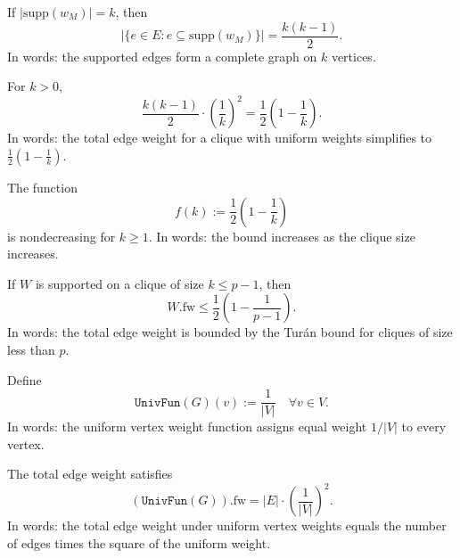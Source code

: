 \begin{lemma}
  \label{lem:clique_size}
  \leanok
If \(|\mathrm{supp}(w_M)| = k\), then
\[
|\{ e \in E : e \subseteq \mathrm{supp}(w_M) \}| = \frac{k(k-1)}{2}.
\]
In words: the supported edges form a complete graph on \(k\) vertices.
\end{lemma}

\begin{lemma}
  \label{lem:computation}
  \leanok
For \(k > 0\),
\[
\frac{k(k-1)}{2} \cdot \left(\frac{1}{k}\right)^2 = \frac{1}{2}\left(1 - \frac{1}{k}\right).
\]
In words: the total edge weight for a clique with uniform weights simplifies to \(\frac{1}{2}(1 - \frac{1}{k})\).
\end{lemma}

\begin{lemma}
  \label{lem:bound_real}
  \leanok
The function
\[
f(k) := \frac{1}{2}\left(1 - \frac{1}{k}\right)
\]
is nondecreasing for \(k \geq 1\).
In words: the bound increases as the clique size increases.
\end{lemma}

\begin{theorem}
  \label{lem:finale_bound}
  \leanok
If \(W\) is supported on a clique of size \(k \leq p-1\), then
\[
W.\mathrm{fw} \leq \frac{1}{2}\left(1 - \frac{1}{p-1}\right).
\]
In words: the total edge weight is bounded by the Turán bound for cliques of size less than \(p\).
\end{theorem}

\begin{definition}
  \label{def:UnivFun}
  \leanok
Define
\[
\texttt{UnivFun}(G)(v) := \frac{1}{|V|} \quad \forall v \in V.
\]
In words: the uniform vertex weight function assigns equal weight \(1/|V|\) to every vertex.
\end{definition}

\begin{lemma}
  \label{lem:UnivFun_weight}
  \leanok
The total edge weight satisfies
\[
(\texttt{UnivFun}(G)).\mathrm{fw} = |E| \cdot \left(\frac{1}{|V|}\right)^2.
\]
In words: the total edge weight under uniform vertex weights equals the number of edges times the square of the uniform weight.
\end{lemma}


